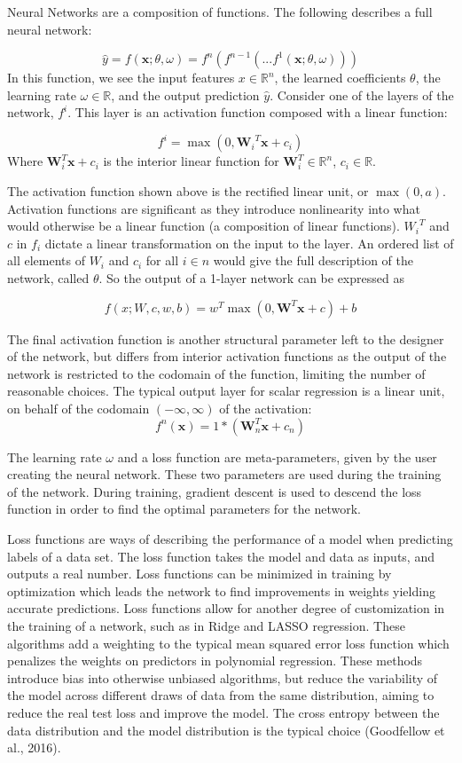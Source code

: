 \documentclass[12pt,twoside]{reedthesis}
\begin{document}
Neural Networks are a composition of functions. The following describes
a full neural network:

\[
\hat y = f(\boldsymbol{x}; \theta, \omega) = f^n ( f^{n-1}  ( ... f^1(\boldsymbol{x}; \theta, \omega)))
\] In this function, we see the input features \(x \in \mathbb{R}^n\),
the learned coefficients \(\theta\), the learning rate
\(\omega \in \mathbb{R}\), and the output prediction \(\hat{y}\).
Consider one of the layers of the network, \(f^i\). This layer is an
activation function composed with a linear function:

\[
f^i = \max ( 0 , {\boldsymbol{W}_i}^T \boldsymbol{x} + c_i)
\] Where \(\boldsymbol{W}_i^T \boldsymbol{x} + c_i\) is the interior
linear function for \(\boldsymbol{W}_i^T \in \mathbb{R}^n\),
\(c_i \in \mathbb{R}\).

The activation function shown above is the rectified linear unit, or
\(\max(0,a)\). Activation functions are significant as they introduce
nonlinearity into what would otherwise be a linear function (a
composition of linear functions). \({W_i}^T\) and \(c\) in \(f_i\)
dictate a linear transformation on the input to the layer. An ordered
list of all elements of \(W_i\) and \(c_i\) for all \(i \in n\) would
give the full description of the network, called \(\theta\). So the
output of a 1-layer network can be expressed as

\[
f(x; W, c, w, b) = w^T \max( 0 , \boldsymbol{W}^T \boldsymbol{x} +c ) +b
\]

The final activation function is another structural parameter left to
the designer of the network, but differs from interior activation
functions as the output of the network is restricted to the codomain of
the function, limiting the number of reasonable choices. The typical
output layer for scalar regression is a linear unit, on behalf of the
codomain \((-\infty,\infty)\) of the activation: \[
f^n(\boldsymbol{x}) = 1*(\boldsymbol{W}_n^T \boldsymbol{x} + c_n)
\]

The learning rate \(\omega\) and a loss function are meta-parameters,
given by the user creating the neural network. These two parameters are
used during the training of the network. During training, gradient
descent is used to descend the loss function in order to find the
optimal parameters for the network.

Loss functions are ways of describing the performance of a model when
predicting labels of a data set. The loss function takes the model and
data as inputs, and outputs a real number. Loss functions can be
minimized in training by optimization which leads the network to find
improvements in weights yielding accurate predictions. Loss functions
allow for another degree of customization in the training of a network,
such as in Ridge and LASSO regression. These algorithms add a weighting
to the typical mean squared error loss function which penalizes the
weights on predictors in polynomial regression. These methods introduce
bias into otherwise unbiased algorithms, but reduce the variability of
the model across different draws of data from the same distribution,
aiming to reduce the real test loss and improve the model. The cross
entropy between the data distribution and the model distribution is the
typical choice (Goodfellow et al., 2016).
\end{document}
